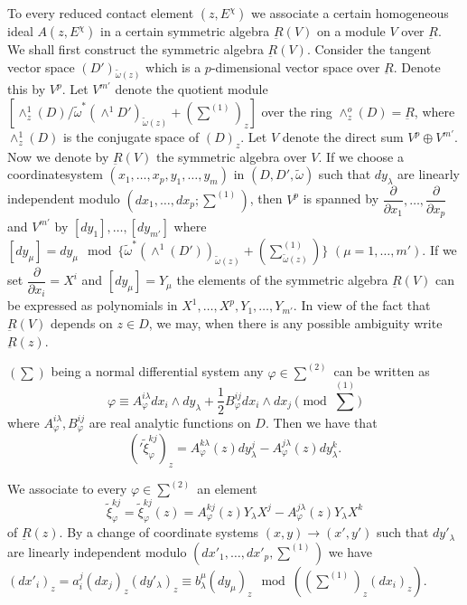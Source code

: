 To every reduced contact element $(z, E^\chi)$ we associate a certain
homogeneous ideal $A(z, E^\chi)$ in a certain symmetric algebra
$\underbar{R}(V)$  on a module $V$ over $\underbar{R}$. We shall first
construct the symmetric algebra $\underbar{R}(V)$. Consider the tangent
vector space $(D')_{\tilde{\omega} (z)}$ which is a $p$-dimensional
vector space over $\underbar{R}$. Denote this by  $V^p$. Let $V^{m'}$
denote the quotient module $[\wedge^1_z (D) / \tilde{\omega}^*
  (\wedge^1 D')_{\tilde{\omega}(z)} + (\sum^{(1)} )_z ]$ over the ring
$\wedge_z^o (D) = \underbar{R}$, where $\wedge^{1}_z (D)$ is the
conjugate space of $(D)_z$. Let $V$ denote the direct sum $V^p \oplus
V^{m'}$. Now we denote by $\underbar{R}(V)$ the symmetric algebra over
$V$. If we choose a coordinate\pageoriginale system $(x_1, \ldots, x_p , y_1,
\ldots, y_m)$ in $(D,D', \tilde{\omega})$ such that $dy_{\lambda}$ are
linearly independent modulo $(dx_1 , \ldots, dx_p ; \sum^{(1)})$, then
$V^p$ is spanned by $\dfrac{\partial}{\partial x_1}, \ldots,
\dfrac{\partial}{\partial x_p}$ and $V^{m'}$ by $[dy_1], \ldots,
      [dy_{m'}]$ where $[dy_{\mu}]= dy_{\mu} \mod \{
      \tilde{\omega}^* (\wedge^1 (D'))_{\tilde{\omega}(z)} + (\sum^{(1)}
      _{\tilde{\omega}(z)}) \}$ $(\mu = 1, \ldots,m')$. If we set
      $\dfrac{\partial}{\partial x_i} = X^i$ and $[dy_{\mu}] =
      Y_{\mu}$ the elements of the symmetric algebra
      $\underbar{R}(V)$ can be expressed as polynomials in $X^1 ,
      \ldots , X^p, Y_1, \ldots, Y_{m'}$. In view of the fact that
      $\underbar{R}(V)$ depends on $z \in D$, we may, when there is
      any possible ambiguity write $\underbar{R}(z)$. 

      $(\sum)$ being a normal differential system any $\varphi \in \sum
      ^{(2)}$ can be written as  
$$
\varphi \equiv A^{i \lambda} _{\varphi} dx_i \wedge dy_{\lambda} +
\frac{1}{2} B^{ij}_{\varphi} dx_i \wedge dx_j \pmod{\textstyle \sum ^{(1)}}  
$$
where $A^{i \lambda}_{\varphi}, B^{ij}_{\varphi}$ are real analytic
functions on $D$. Then we have that 
$$
('\widetilde{\xi}_{\varphi}^{kj})_z = A_{\varphi}^{k \lambda} (z)
dy_{\lambda}^j - A_{\varphi}^{j \lambda} (z) dy_{\lambda}^k. 
$$

\noindent
We associate to every $\varphi \in \sum ^{(2)}$ an element
$$
\tilde{\xi}_{\varphi}^{kj}=\tilde{\xi}_{\varphi}^{kj} (z) =
A_{\varphi}^{kj} (z) Y_{\lambda} X^j - A_{\varphi}^{j \lambda} (z)
Y_{\lambda} X^k 
$$
of $\underbar{R}(z)$. By a change of coordinate   systems $(x,y) \to
(x', y')$ such that $dy'_{\lambda}$ are linearly independent modulo
$(dx'_1 ,\ldots, dx'_p, \sum^{(1)})$ we have $(dx'_i)_z = a_i^j
(dx_j)_z (dy'_{\lambda})_z \equiv b_{\lambda}^{\mu} (dy_{\mu})_z \mod
((\sum^{(1)})_z (dx_i)_z)$.  

